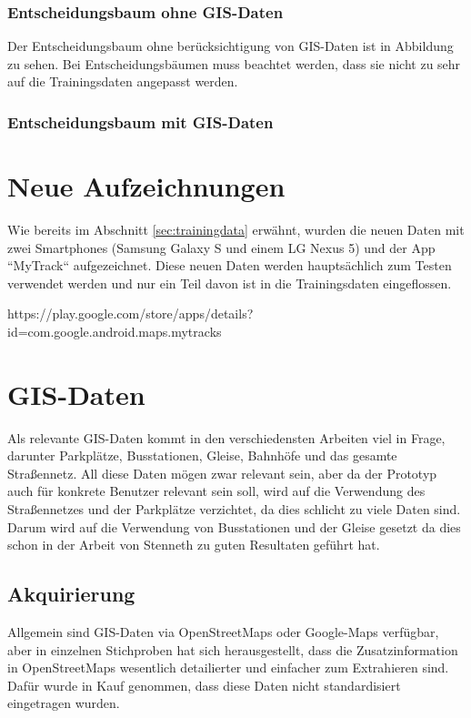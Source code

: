 \subsubsection{Entscheidungsbaum ohne GIS-Daten}
Der Entscheidungsbaum ohne berücksichtigung von GIS-Daten ist in Abbildung  zu sehen. Bei Entscheidungsbäumen muss beachtet werden, dass sie nicht zu sehr auf die Trainingsdaten angepasst werden.


\subsubsection{Entscheidungsbaum mit GIS-Daten}


\section{Neue Aufzeichnungen}
Wie bereits im Abschnitt \ref{sec:trainingdata} erwähnt, wurden die neuen Daten mit zwei Smartphones (Samsung Galaxy S und einem LG Nexus 5) und der App ``MyTrack`` aufgezeichnet. Diese neuen Daten werden hauptsächlich zum Testen verwendet werden und nur ein Teil davon ist in die Trainingsdaten eingeflossen. 

https://play.google.com/store/apps/details?id=com.google.android.maps.mytracks

\section{GIS-Daten}
Als relevante GIS-Daten kommt in den verschiedensten Arbeiten viel in Frage, darunter Parkplätze, Busstationen, Gleise, Bahnhöfe und das gesamte Straßennetz. All diese Daten mögen zwar relevant sein, aber da der Prototyp auch für konkrete Benutzer relevant sein soll, wird auf die Verwendung des Straßennetzes und der Parkplätze verzichtet, da dies schlicht zu viele Daten sind. Darum wird auf die Verwendung von Busstationen und der Gleise gesetzt da dies schon in der Arbeit von Stenneth \cite{stenneth_transportation_2011} zu guten Resultaten geführt hat.

\subsection{Akquirierung}
Allgemein sind GIS-Daten via OpenStreetMaps oder Google-Maps verfügbar, aber in einzelnen Stichproben hat sich herausgestellt, dass die Zusatzinformation in OpenStreetMaps wesentlich detailierter und einfacher zum Extrahieren sind. Dafür wurde in Kauf genommen, dass diese Daten nicht standardisiert eingetragen wurden.

